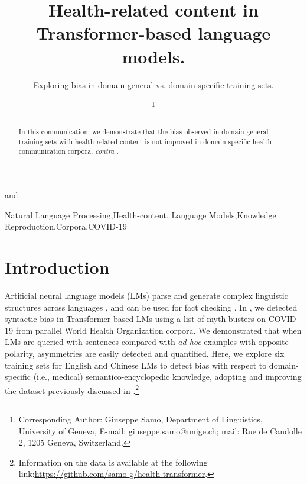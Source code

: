 \documentclass{IOS-Book-Article}
\def\hb{\hbox to 11.5 cm{}}
\begin{document}
\pagestyle{headings}
\def\thepage{}
\begin{frontmatter}              %


\title{Health-related content in Transformer-based language models.}

\markboth{}{January 2023\hb}
\subtitle{Exploring bias in domain general vs. domain specific training sets.}

\vspace{-4mm}
\author[A]{ %
}
and
\author[B]{ 
\thanks{Corresponding Author: Giuseppe Samo, Department of Linguistics, University of Geneva, E-mail: giuseppe.samo@unige.ch; mail: Rue de Candolle 2, 1205 Geneva, Switzerland. }}
\address[A]{University of Cambridge}
\address[B]{University of Geneva}

\begin{abstract}
In this communication, we demonstrate that the bias observed in domain general training sets with health-related content is not improved in domain specific health-communication corpora, \textit{contra} \cite{r1}.
\end{abstract}

\begin{keyword}
Natural Language Processing\sep Health-content\sep 
Language Models\sep Knowledge Reproduction\sep Corpora\sep COVID-19
\end{keyword}
\end{frontmatter}
\markboth{January 2023\hb}{January 2023\hb}

\vspace{-6mm}
\section{Introduction}

Artificial neural language models (LMs) parse and generate complex linguistic structures across languages \cite{r2}, and can be used for fact checking \cite{r3}. 
In \cite{r1}, we detected syntactic bias in Transformer-based LMs using a list of myth busters on COVID-19 from parallel World Health Organization corpora. We demonstrated that when LMs are queried with sentences compared with \textit{ad hoc} examples with opposite polarity, asymmetries are easily detected and quantified.
Here, we explore six training sets for English and Chinese LMs to detect bias with respect to domain-specific (i.e., medical) semantico-encyclopedic knowledge, adopting and improving the dataset previously discussed in \cite{r1}.\footnote{Information on the data is available at the following link:\href{https://github.com/samo-g/health-transformer}{\underline{https://github.com/samo-g/health-transformer}}.}
\end{document}
